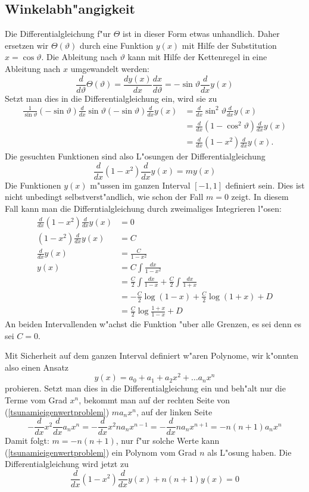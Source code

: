 \subsection{Winkelabh"angigkeit}
Die Differentialgleichung f"ur $\Theta$ ist in dieser Form
etwas unhandlich. Daher ersetzen wir $\Theta(\vartheta)$ durch eine
Funktion $y(x)$ mit Hilfe der Substitution $x=\cos\vartheta$.
Die Ableitung nach $\vartheta$ kann mit Hilfe der Kettenregel
in eine Ableitung nach $x$ umgewandelt werden:
$$
\frac{d}{d\vartheta}\Theta(\vartheta)
=\frac{dy(x)}{dx}\frac{dx}{d\vartheta}
=-\sin\vartheta \frac{d}{dx} y(x)
$$
Setzt man dies in die Differentialgleichung ein, wird sie zu
\begin{align*}
\frac1{\sin\vartheta}
(-\sin{\vartheta})\frac{d}{dx}\sin\vartheta (-\sin\vartheta)
\frac{d}{dx}y(x)
&=
\frac{d}{dx}\sin^2\vartheta\frac{d}{dx}y(x)\\
&=
\frac{d}{dx}(1-\cos^2\vartheta)\frac{d}{dx}y(x)\\
&=
\frac{d}{dx}(1-x^2)\frac{d}{dx}y(x).
\end{align*}
Die gesuchten Funktionen sind also L"osungen der Differentialgleichung
\begin{equation}
\frac{d}{dx}(1-x^2)\frac{d}{dx}y(x)
=
my(x)
\label{tsunamieigenwertproblem}
\end{equation}
Die Funktionen $y(x)$ m"ussen im ganzen Interval $[-1,1]$ definiert
sein. Dies ist nicht unbedingt selbstverst"andlich, wie schon der Fall
$m=0$ zeigt. In diesem Fall kann man die Differntialgleichung
durch zweimaliges Integrieren l"osen:
\begin{align*}
\frac{d}{dx}(1-x^2)\frac{d}{dx}y(x)&=0\\
(1-x^2)\frac{d}{dx}y(x)&=C\\
\frac{d}{dx}y(x)&=\frac{C}{1-x^2}\\
y(x)&=C\int\frac{dx}{1-x^2}\\
&=\frac{C}2\int\frac{dx}{1-x}+\frac{C}2\int\frac{dx}{1+x}\\
&=-\frac{C}2\log(1-x)+\frac{C}2\log(1+x) +D\\
&=\frac{C}2\log\frac{1+x}{1-x} + D
\end{align*}
An beiden Intervallenden w"achst die Funktion "uber alle Grenzen,
es sei denn es sei $C=0$.

Mit Sicherheit auf dem ganzen Interval definiert w"aren Polynome,
wir k"onnten also einen Ansatz
$$
y(x)=a_0+a_1+a_2x^2+\dots a_nx^n
$$
probieren. Setzt man dies in die Differentialgleichung ein und
beh"alt nur die Terme vom Grad $x^n$, bekommt man auf der rechten
Seite von (\ref{tsunamieigenwertproblem}) $ma_nx^n$, auf
der linken Seite
$$
-\frac{d}{dx}x^2\frac{d}{dx}a_nx^n
=
-\frac{d}{dx}x^2na_nx^{n-1}
=
-\frac{d}{dx}na_nx^{n+1}
=
-n(n+1)a_nx^n
$$
Damit folgt: $m=-n(n+1)$, nur f"ur solche Werte kann
(\ref{tsunamieigenwertproblem}) ein Polynom vom Grad $n$ als L"osung
haben. Die Differentialgleichung wird jetzt zu
\begin{equation}
\frac{d}{dx}(1-x^2)\frac{d}{dx}y(x)+n(n+1)y(x)=0
\label{legendredgl}
\end{equation}

